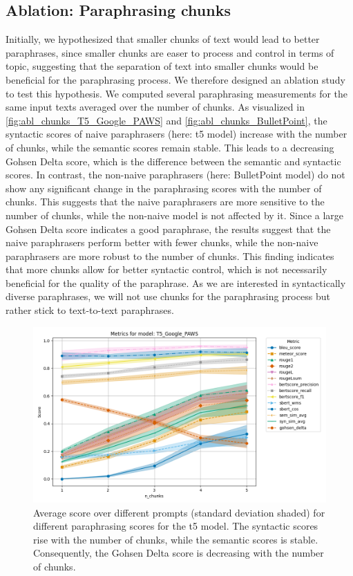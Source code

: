 \subsection{Ablation: Paraphrasing chunks}
\label{subsec:paraphrasing_chunks}

Initially, we hypothesized that smaller chunks of text would lead to better paraphrases, 
since smaller chunks are easer to process and control in terms of topic,
suggesting that the separation of text into smaller chunks would be beneficial for the paraphrasing process.
We therefore designed an ablation study to test this hypothesis.
We computed several paraphrasing measurements for the same input texts averaged over the number of chunks.
As visualized in \autoref{fig:abl_chunks_T5_Google_PAWS} and \autoref{fig:abl_chunks_BulletPoint},
the syntactic scores of naive paraphrasers (here: \ac{t5} model) increase with the number of chunks,
while the semantic scores remain stable.
This leads to a decreasing Gohsen Delta score, which is the difference between the semantic and syntactic scores.
In contrast, the non-naive paraphrasers (here: BulletPoint model) do not show any significant change in the paraphrasing scores with the number of chunks.
This suggests that the naive paraphrasers are more sensitive to the number of chunks, 
while the non-naive model is not affected by it.
Since a large Gohsen Delta score indicates a good paraphrase,
the results suggest that the naive paraphrasers perform better with fewer chunks, 
while the non-naive paraphrasers are more robust to the number of chunks.
This finding indicates that more chunks allow for better syntactic control, which is not necessarily beneficial for the quality of the paraphrase.
As we are interested in syntactically diverse paraphrases,
we will not use chunks for the paraphrasing process but rather stick to text-to-text paraphrases.
 
\begin{figure}[htbp]
    \centering
    \includegraphics[width=\textwidth]{images/paraphrasing/experiments/T5_Google_PAWS_metrics_plot.png}
    \caption{Average score over different prompts (standard deviation shaded) for different paraphrasing scores for the \ac{t5} model.
    The syntactic scores rise with the number of chunks, while the semantic scores is stable.
    Consequently, the Gohsen Delta score is decreasing with the number of chunks.}
    \label{fig:abl_chunks_T5_Google_PAWS}
\end{figure}


